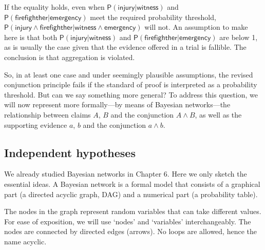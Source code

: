 \documentclass[
  10pt,
  dvipsnames,enabledeprecatedfontcommands]{scrartcl}
\newcommand{\pr}[1]{\ensuremath{\mathsf{P}(#1)}}
\begin{document}
\noindent If the equality holds, even when
\(\pr{\textsf{injury} \vert \textsf{witness}}\) and
\(\pr{\textsf{firefighther} \vert \textsf{emergency} }\) meet the
required probability threshold,
\(\pr{\textsf{injury} \wedge \textsf{firefighther} \vert \textsf{witness} \wedge \textsf{emergency}}\)
will not. An assumption to make here is that both
\(\pr{\textsf{injury} \vert \textsf{witness}}\) and
\(\pr{\textsf{firefighther} \vert \textsf{emergency} }\) are below 1, as
is usually the case given that the evidence offered in a trial is
fallible. The conclusion is that aggregation is violated.

So, in at least one case and under seemingly plausible assumptions, the
revised conjunction principle fails if the standard of proof is
interpreted as a probability threshold. But can we say something more
general? To address this question, we will now represent more
formally---by means of Bayesian networks---the relationship between
claims \(A\), \(B\) and the conjunction \(A\wedge B\), as well as the
supporting evidence \(a\), \(b\) and the conjunction \(a\wedge b\).

\hypertarget{independent-hypotheses}{%
\subsection{Independent hypotheses}\label{independent-hypotheses}}

We already studied Bayesian networks in Chapter 6.
 Here we only sketch the essential ideas. A
Bayesian network is a formal model that consists of a graphical part (a
directed acyclic graph, \textsf{DAG}) and a numerical part (a
probability table).

The nodes in the graph represent random variables that can take
different values. For ease of exposition, we will use `nodes' and
`variables' interchangeably. The nodes are connected by directed edges
(arrows). No loops are allowed, hence the name acyclic.
\end{document}
